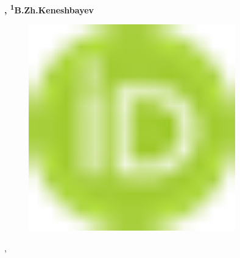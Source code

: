 {\bfseries ,
\textsuperscript{1}B.Zh.Keneshbayev}
\begin{figure}[H]
	\centering
	\includegraphics[width=0.8\textwidth]{media/ekon/image1}
	\caption*{}
\end{figure}
,

